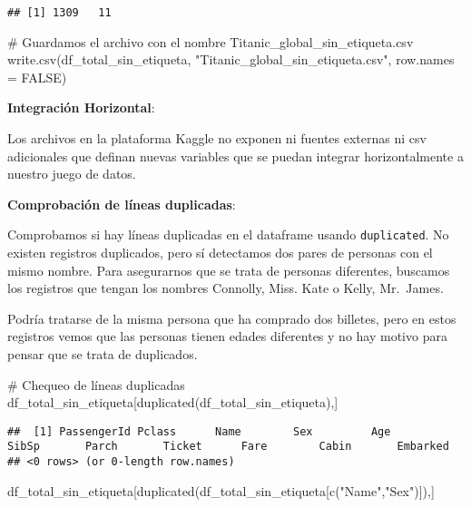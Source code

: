 \documentclass[
]{article}
\newenvironment{Shaded}{\begin{snugshade}}{\end{snugshade}}
\newcommand{\CommentTok}[1]{\textcolor[rgb]{0.50,0.62,0.50}{#1}}
\newcommand{\DataTypeTok}[1]{\textcolor[rgb]{0.87,0.87,0.75}{#1}}
\newcommand{\KeywordTok}[1]{\textcolor[rgb]{0.94,0.87,0.69}{#1}}
\newcommand{\NormalTok}[1]{\textcolor[rgb]{0.80,0.80,0.80}{#1}}
\newcommand{\OtherTok}[1]{\textcolor[rgb]{0.94,0.94,0.56}{#1}}
\newcommand{\StringTok}[1]{\textcolor[rgb]{0.80,0.58,0.58}{#1}}
\begin{document}
\begin{verbatim}
## [1] 1309   11
\end{verbatim}

\begin{Shaded}
\begin{Highlighting}[]
\CommentTok{# Guardamos el archivo con el nombre Titanic_global_sin_etiqueta.csv}
\KeywordTok{write.csv}\NormalTok{(df_total_sin_etiqueta, }\StringTok{"Titanic_global_sin_etiqueta.csv"}\NormalTok{, }\DataTypeTok{row.names =} \OtherTok{FALSE}\NormalTok{)}
\end{Highlighting}
\end{Shaded}

\textbf{Integración Horizontal}:

Los archivos en la plataforma Kaggle no exponen ni fuentes externas ni
csv adicionales que definan nuevas variables que se puedan integrar
horizontalmente a nuestro juego de datos.

\textbf{Comprobación de líneas duplicadas}:

Comprobamos si hay líneas duplicadas en el dataframe usando
\texttt{duplicated}. No existen registros duplicados, pero sí detectamos
dos pares de personas con el mismo nombre. Para asegurarnos que se trata
de personas diferentes, buscamos los registros que tengan los nombres
Connolly, Miss. Kate o Kelly, Mr.~James.

Podría tratarse de la misma persona que ha comprado dos billetes, pero
en estos registros vemos que las personas tienen edades diferentes y no
hay motivo para pensar que se trata de duplicados.

\begin{Shaded}
\begin{Highlighting}[]
\CommentTok{# Chequeo de líneas duplicadas}
\NormalTok{df_total_sin_etiqueta[}\KeywordTok{duplicated}\NormalTok{(df_total_sin_etiqueta),]}
\end{Highlighting}
\end{Shaded}

\begin{verbatim}
##  [1] PassengerId Pclass      Name        Sex         Age         SibSp       Parch       Ticket      Fare        Cabin       Embarked   
## <0 rows> (or 0-length row.names)
\end{verbatim}

\begin{Shaded}
\begin{Highlighting}[]
\NormalTok{df_total_sin_etiqueta[}\KeywordTok{duplicated}\NormalTok{(df_total_sin_etiqueta[}\KeywordTok{c}\NormalTok{(}\StringTok{"Name"}\NormalTok{,}\StringTok{"Sex"}\NormalTok{)]),]}
\end{Highlighting}
\end{Shaded}
\end{document}
